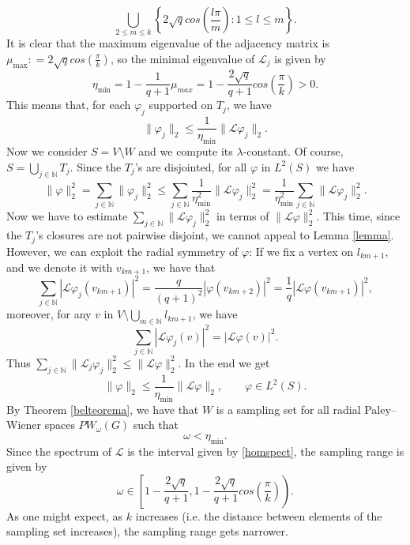\documentclass[12pt]{amsart}
\theoremstyle{definition}
\numberwithin{equation}{section}
\theoremstyle{definition}
\theoremstyle{remark}
\numberwithin{equation}{section}
\begin{document}
$$
\bigcup_{2 \leq m \leq k}\left\{2\sqrt{q}cos\left(\frac{l\pi}{m}\right): 1 \leq l \leq m \right\}.
$$
It is clear that the maximum eigenvalue of the adjacency matrix is $\mu_{\mathrm{max}}: = 2\sqrt{q}cos\left(\frac{\pi}{k}\right)$, so the minimal eigenvalue of $\mathcal{L}_j$ is given by
$$
\eta_{\mathrm{min}} = 1- \frac{1}{q+1}\mu_{max} = 1- \frac{2\sqrt{q}}{q+1}cos\left(\frac{\pi}{k}\right) > 0.
$$
This means that, for each $\varphi_j$ supported on $T_j$, we have
\begin{equation}
    \label{phi_est}
    \|\varphi_j\|_2 \leq \frac{1}{\eta_{\mathrm{min}}}\|\mathcal{L}\varphi_j\|_2.
\end{equation}
Now we consider $S = V\setminus W$ and we compute its $\lambda$-constant. Of course, $S= \bigcup_{j \in \mathbb{N}}T_j$. Since the $T_j$'s are disjointed, for all $\varphi$ in $L^2(S)$ we have
$$
\|\varphi\|^2_2 = \sum_{j \in \mathbb{N}}\|\varphi_j\|^2_2 \leq \sum_{j \in \mathbb{N}}\frac{1}{\eta_{\mathrm{min}}^2}\|\mathcal{L}\varphi_j\|^2_2 = \frac{1}{\eta_{\mathrm{min}}^2}\sum_{j \in \mathbb{N}}\|\mathcal{L}\varphi_j\|^2_2.
$$
Now we have to estimate $\sum_{j \in \mathbb{N}}\|\mathcal{L}\varphi_j\|^2_2$ in terms of $\|\mathcal{L}\varphi\|^2_2$. This time, since the $T_j$'s closures are not pairwise disjoint, we cannot appeal to Lemma \ref{lemma}. However, we can exploit the radial symmetry of $\varphi$: If we fix a vertex on $l_{km+1}$, and we denote it with $v_{km+1}$, we have that 
$$
\sum_{j \in \mathbb{N}}|\mathcal{L}\varphi_j(v_{km+1})|^2 = \frac{q}{(q+1)^2}|\varphi(v_{km+2})|^2 = \frac{1}{q}|\mathcal{L}\varphi(v_{km+1})|^2,
$$
moreover, for any $v$ in $V\setminus\bigcup_{m \in \mathbb{N}}l_{km+1}$, we have $$
\sum_{j \in \mathbb{N}}|\mathcal{L}\varphi_j(v)|^2=|\mathcal{L}\varphi(v)|^2.
$$
Thus $\sum_{j \in \mathbb{N}}\|\mathcal{L}_j\varphi_j\|^2_2 \leq \|\mathcal{L}\varphi\|^2_2$. In the end we get
\begin{equation}
    \|\varphi\|_2 \leq \frac{1}{\eta_{\mathrm{min}}}\|\mathcal{L}\varphi\|_2, \qquad \varphi \in L^2(S).
\end{equation}
By Theorem \ref{belteorema}, we have that $W$ is a sampling set for all radial Paley--Wiener spaces $PW_\omega(G)$ such that
$$
\omega < \eta_{\mathrm{min}}.
$$
Since the spectrum of $\mathcal{L}$ is the interval given by \eqref{homspect}, the sampling range is given by
$$
\omega \in \left[1 - \frac{2\sqrt{q}}{q+1},1- \frac{2\sqrt{q}}{q+1}cos\left(\frac{\pi}{k}\right)\right).
$$
As one might expect, as $k$ increases (i.e. the distance between elements of the sampling set increases), the sampling range gets narrower.
\end{document}
